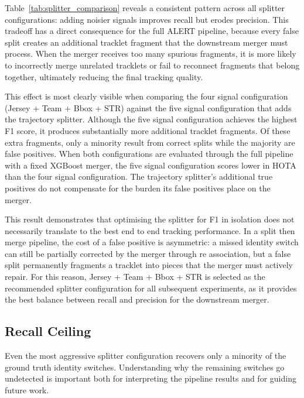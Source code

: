 Table~\ref{tab:splitter_comparison} reveals a consistent pattern across all splitter configurations: adding noisier signals improves recall but erodes precision. This tradeoff has a direct consequence for the full ALERT pipeline, because every false split creates an additional tracklet fragment that the downstream merger must process. When the merger receives too many spurious fragments, it is more likely to incorrectly merge unrelated tracklets or fail to reconnect fragments that belong together, ultimately reducing the final tracking quality.

This effect is most clearly visible when comparing the four signal configuration (Jersey + Team + Bbox + STR) against the five signal configuration that adds the trajectory splitter. Although the five signal configuration achieves the highest F1 score, it produces substantially more additional tracklet fragments. Of these extra fragments, only a minority result from correct splits while the majority are false positives. When both configurations are evaluated through the full pipeline with a fixed XGBoost merger, the five signal configuration scores lower in HOTA than the four signal configuration. The trajectory splitter's additional true positives do not compensate for the burden its false positives place on the merger.

This result demonstrates that optimising the splitter for F1 in isolation does not necessarily translate to the best end to end tracking performance. In a split then merge pipeline, the cost of a false positive is asymmetric: a missed identity switch can still be partially corrected by the merger through re association, but a false split permanently fragments a tracklet into pieces that the merger must actively repair. For this reason, Jersey + Team + Bbox + STR is selected as the recommended splitter configuration for all subsequent experiments, as it provides the best balance between recall and precision for the downstream merger.

\subsection{Recall Ceiling}\label{sec:recall_ceiling}

Even the most aggressive splitter configuration recovers only a minority of the ground truth identity switches. Understanding why the remaining switches go undetected is important both for interpreting the pipeline results and for guiding future work.

